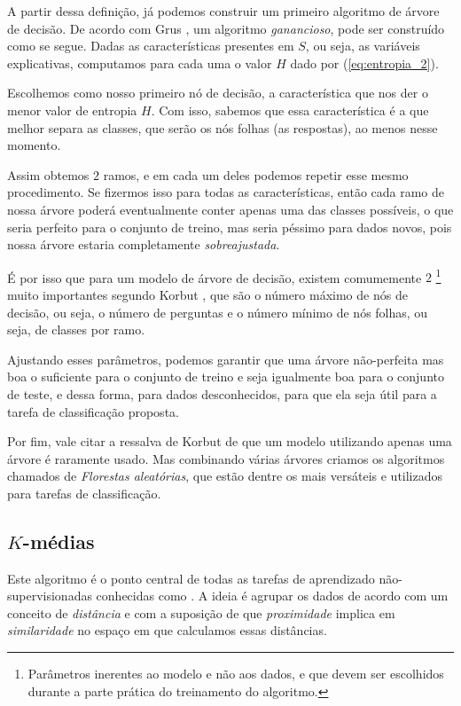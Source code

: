 A partir dessa definição, já podemos construir um primeiro algoritmo de árvore de decisão. De acordo com Grus \citep{data}, um algoritmo \emph{ganancioso}, pode ser construído como se segue. Dadas as características presentes em $S$, ou seja, as variáveis explicativas, computamos para cada uma o valor $H$ dado por (\ref{eq:entropia_2}).

Escolhemos como nosso primeiro nó de decisão, a característica que nos der o menor valor de entropia $H$. Com isso, sabemos que essa característica é a que melhor separa as classes, que serão os nós folhas (as respostas), ao menos nesse momento.

Assim obtemos $2$ ramos, e em cada um deles podemos repetir esse mesmo procedimento. Se fizermos isso para todas as características, então cada ramo de nossa árvore poderá eventualmente conter apenas uma das classes possíveis, o que seria perfeito para o conjunto de treino, mas seria péssimo para dados novos, pois nossa árvore estaria completamente \emph{sobreajustada}.

É por isso que para um modelo de árvore de decisão, existem comumemente $2$ \footnote{Parâmetros inerentes ao modelo e não aos dados, e que devem ser escolhidos durante a parte prática do treinamento do algoritmo.} muito importantes segundo Korbut \citep{korbut}, que são o número máximo de nós de decisão, ou seja, o número de perguntas e o número mínimo de nós folhas, ou seja, de classes por ramo.

Ajustando esses parâmetros, podemos garantir que uma árvore não-perfeita mas boa o suficiente para o conjunto de treino e seja igualmente boa para o conjunto de teste, e dessa forma, para dados desconhecidos, para que ela seja útil para a tarefa de classificação proposta.

Por fim, vale citar a ressalva de Korbut \citep{korbut} de que um modelo utilizando apenas uma árvore é raramente usado. Mas combinando várias árvores criamos os algoritmos chamados de \emph{Florestas aleatórias}, que estão dentre os mais versáteis e utilizados para tarefas de classificação.

\subsection{$K$-médias}

Este algoritmo é o ponto central de todas as tarefas de aprendizado não-supervisionadas conhecidas como . A ideia é agrupar os dados de acordo com um conceito de \emph{distância} e com a suposição de que \emph{proximidade} implica em \emph{similaridade} no espaço em que calculamos essas distâncias.

